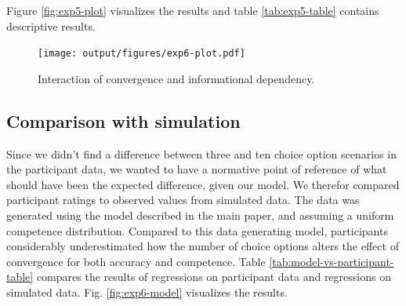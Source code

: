 \documentclass[
  doc,floatsintext]{apa6}
\begin{document}
Figure \ref{fig:exp5-plot} visualizes the results and table \ref{tab:exp5-table} contains descriptive results.

\begin{table}
\centering\centering
\caption{\label{tab:exp6-table}}
\centering
{}
\end{table}



\begin{figure}
\centering
\texttt{[image: output/figures/exp6-plot.pdf]}
\caption{\label{fig:exp6-plot}Interaction of convergence and informational dependency.}
\end{figure}

\subsection{Comparison with simulation}\label{comparison-with-simulation-1}

Since we didn't find a difference between three and ten choice option scenarios in the participant data, we wanted to have a normative point of reference of what should have been the expected difference, given our model. We therefor compared participant ratings to observed values from simulated data. The data was generated using the model described in the main paper, and assuming a uniform competence distribution. Compared to this data generating model, participants considerably underestimated how the number of choice options alters the effect of convergence for both accuracy and competence. Table \ref{tab:model-vs-participant-table} compares the results of regressions on participant data and regressions on simulated data. Fig. \ref{fig:exp6-model} visualizes the results.
\end{document}
